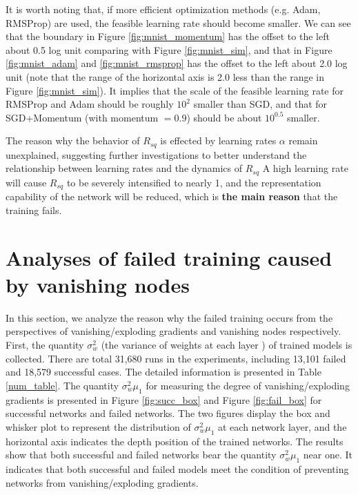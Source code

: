 It is worth noting that, if more efficient optimization methods (e.g. Adam, RMSProp) are used, the
feasible learning rate should become smaller. We can see that the boundary in Figure \ref{fig:mnist_momentum}
has the offset to the left about 0.5 log unit comparing with Figure \ref{fig:mnist_sim}, and that in Figure
\ref{fig:mnist_adam} and \ref{fig:mnist_rmsprop} has the offset to the left about 2.0 log unit (note that
the range of the horizontal axis is 2.0 less than the range in Figure \ref{fig:mnist_sim}). It implies that
the scale of the feasible learning rate for RMSProp and Adam should be roughly $10^2$ smaller than SGD, and
that for SGD+Momentum (with momentum $=0.9$) should be about $10^{0.5}$ smaller.

The reason why the behavior of $R_{sq}$ is effected by learning rates $\alpha$ remain unexplained,
suggesting further investigations to better understand the relationship between learning rates and the
dynamics of $R_{sq}$
A high learning rate will cause $R_{sq}$ to be severely intensified to nearly 1, and the representation
capability of the network will be reduced, which is \textbf{the main reason} that the training fails.


\section{Analyses of failed training caused by vanishing nodes}

In this section, we analyze the reason why the failed training occurs from the perspectives of vanishing/exploding gradients and vanishing nodes respectively.
First, the quantity $\sigma_w^2$ (the variance of weights at each layer ) of trained models is collected.
There are total 31,680 runs in the experiments, including 13,101 failed and 18,579 successful cases.
The detailed information is presented in Table \ref{num_table}.
The quantity $\sigma_w^2\mu_1$ for measuring the degree of vanishing/exploding gradients is presented in Figure \ref{fig:succ_box} and Figure \ref{fig:fail_box} for successful networks and failed networks.
The two figures display the box and whisker plot to represent the distribution of $\sigma_w^2\mu_1$ at each network layer, and the horizontal axis indicates the depth position of the trained networks. 
The results show that both successful and failed networks bear the quantity $\sigma_w^2\mu_1$ near one.
It indicates that both successful and failed models meet the condition of preventing networks from vanishing/exploding gradients.

